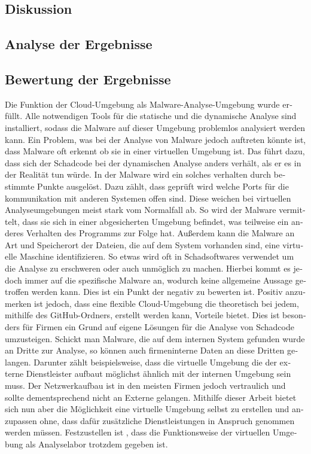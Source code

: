 \begin{otherlanguage}{ngerman}
\section{Diskussion}
\subsection{Analyse der Ergebnisse}

\subsection{Bewertung der Ergebnisse} \label{Bewertung}
Die Funktion der Cloud-Umgebung als Malware-Analyse-Umgebung wurde erfüllt. Alle notwendigen Tools für die statische und die dynamische Analyse sind installiert, sodass die Malware auf dieser Umgebung problemlos analysiert werden kann. Ein Problem, was bei der Analyse von Malware jedoch auftreten könnte ist, dass Malware oft erkennt ob sie in einer virtuellen Umgebung ist. Das führt dazu, dass sich der Schadcode bei der dynamischen Analyse anders verhält, als er es in der Realität tun würde. In der Malware wird ein solches verhalten durch bestimmte Punkte ausgelöst. Dazu zählt, dass geprüft wird welche Ports für die kommunikation mit anderen Systemen offen sind. Diese weichen bei virtuellen Analyseumgebungen meist stark vom Normalfall ab. So wird der Malware vermittelt, dass sie sich in einer abgesicherten Umgebung befindet, was teilweise ein anderes Verhalten des Programms zur Folge hat. Außerdem kann die Malware an Art und Speicherort der Dateien, die auf dem System vorhanden sind, eine virtuelle Maschine identifizieren. So etwas wird oft in Schadsoftwares verwendet um die Analyse zu erschweren oder auch unmöglich zu machen. Hierbei kommt es jedoch immer auf die spezifische Malware an, wodurch keine allgemeine Aussage getroffen werden kann. Dies ist ein Punkt der negativ zu bewerten ist.\newline
Positiv anzumerken ist jedoch, dass eine flexible Cloud-Umgebung die theoretisch bei jedem, mithilfe des GitHub-Ordners, erstellt werden kann, Vorteile bietet. Dies ist besonders für Firmen ein Grund auf eigene Lösungen für die Analyse von Schadcode umzusteigen. Schickt man Malware, die auf dem internen System gefunden wurde an Dritte zur Analyse, so können auch firmeninterne Daten an diese Dritten gelangen. Darunter zählt beispielsweise, dass die virtuelle Umgebung die der externe Dienstleister aufbaut möglichst ähnlich mit der internen Umgebung sein muss. Der Netzwerkaufbau ist in den meisten Firmen jedoch vertraulich und sollte dementsprechend nicht an Externe gelangen. Mithilfe dieser Arbeit bietet sich nun aber die Möglichkeit eine virtuelle Umgebung selbst zu erstellen und anzupassen ohne, dass dafür zusätzliche Dienstleistungen in Anspruch genommen werden müssen. 
Festzustellen ist , dass die Funktionsweise der virtuellen Umgebung als Analyselabor trotzdem gegeben ist.

\end{otherlanguage}
